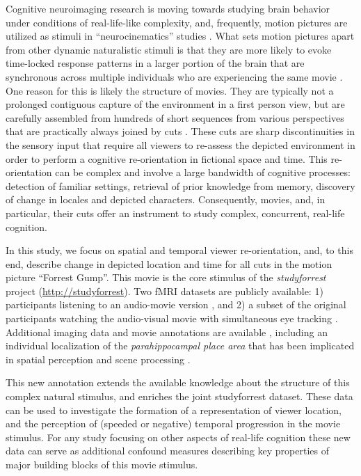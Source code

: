 \documentclass[10pt,a4paper,twocolumn]{article}
\begin{document}
Cognitive neuroimaging research is moving towards studying brain behavior under
conditions of real-life-like complexity, and, frequently, motion pictures are
utilized as stimuli in ``neurocinematics'' studies
\citep{hasson_2008_neurocinematics}. What sets motion pictures apart from other
dynamic naturalistic stimuli is that they are more likely to evoke time-locked
response patterns in a larger portion of the brain that are synchronous across
multiple individuals who are experiencing the same movie
\citep{hasson_2009_natural_stim_review,lankinen_2014_MEG_during_movie}. One
reason for this is likely the structure of movies. They are typically not a
prolonged contiguous capture of the environment in a first person view, but are
carefully assembled from hundreds of short sequences from various perspectives
that are practically always joined by cuts
\citep{cutting_2011_changing_poetics_of_dissolve}. These cuts are sharp
discontinuities in the sensory input that require all viewers to re-assess the
depicted environment in order to perform a cognitive re-orientation in
fictional space and time. This re-orientation can be complex and involve a
large bandwidth of cognitive processes: detection of familiar settings,
retrieval of prior knowledge from memory, discovery of change in locales and
depicted characters. Consequently, movies, and, in particular, their cuts offer
an instrument to study complex, concurrent, real-life cognition.

In this study, we focus on spatial and temporal viewer re-orientation, and, to
this end, describe change in depicted location and time for all cuts in the
motion picture ``Forrest Gump''. This movie is the core stimulus of the
\textit{studyforrest} project (\url{http://studyforrest}). Two fMRI datasets
are publicly available: 1) participants listening to an audio-movie version
\citep{HBI+14}, and 2) a subset of the original participants watching the
audio-visual movie with simultaneous eye tracking \citep{HAK+16}. Additional
imaging data and movie annotations are available \citep{HDH+2015,LRS+2015},
including an individual localization of the \textit{parahippocampal place area}
\citep{SKG+16} that has been implicated in spatial perception and scene
processing \citep{EK1998}.

This new annotation extends the available knowledge about the structure of this
complex natural stimulus, and enriches the joint studyforrest dataset. These
data can be used to investigate the formation of a representation of viewer
location, and the perception of (speeded or negative) temporal progression in
the movie stimulus. For any study focusing on other aspects of real-life
cognition these new data can serve as additional confound measures describing
key properties of major building blocks of this movie stimulus.
\end{document}
